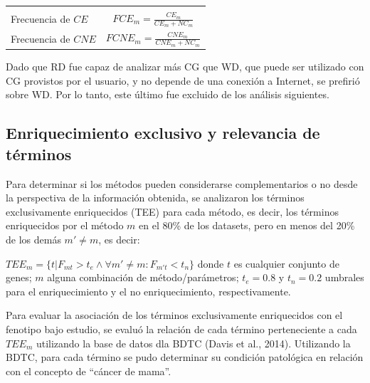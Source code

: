 \documentclass[12pt,twoside]{reedthesis}
\begin{document}
\begin{longtable}[]{@{}lc@{}}
\begin{minipage}[t]{0.50\columnwidth}
\end{minipage}\tabularnewline
\begin{minipage}[t]{0.44\columnwidth}\raggedright
Frecuencia de \(CE\)\strut
\end{minipage} & \begin{minipage}[t]{0.50\columnwidth}\centering
\(FCE_m=\frac{CE_m}{CE_m+NC_m}\)\strut
\end{minipage}\tabularnewline
\begin{minipage}[t]{0.44\columnwidth}\raggedright
Frecuencia de \(CNE\)\strut
\end{minipage} & \begin{minipage}[t]{0.50\columnwidth}\centering
\(FCNE_m=\frac{CNE_m}{CNE_m+NC_m}\)\strut
\end{minipage}\tabularnewline
\bottomrule
\end{longtable}
\par

Dado que RD fue capaz de analizar más CG que WD, que puede ser utilizado con CG provistos por el usuario, y no depende de una conexión a Internet, se prefirió sobre WD. Por lo tanto, este último fue excluido de los análisis siguientes.

\hypertarget{enriquecimiento-exclusivo-y-relevancia-de-terminos}{%
\subsection{Enriquecimiento exclusivo y relevancia de términos}\label{enriquecimiento-exclusivo-y-relevancia-de-terminos}}

\par

Para determinar si los métodos pueden considerarse complementarios o no desde la perspectiva de la información obtenida, se analizaron los términos exclusivamente enriquecidos (TEE) para cada método, es decir, los términos enriquecidos por el método \(m\) en el 80\% de los datasets, pero en menos del 20\% de los demás \(m' \neq m\), es decir:

\(TEE_m=\{t|F_{mt}>t_e \wedge \forall m' \neq m : F_{m't} < t_n \}\)
donde \(t\) es cualquier conjunto de genes; \(m\) alguna combinación de método/parámetros; \(t_e=0.8\) y \(t_n=0.2\) umbrales para el enriquecimiento y el no enriquecimiento, respectivamente.

\par

Para evaluar la asociación de los términos exclusivamente enriquecidos con el fenotipo bajo estudio, se evaluó la relación de cada término perteneciente a cada \(TEE_m\) utilizando la base de datos dla BDTC (Davis et al., 2014). Utilizando la BDTC, para cada término se pudo determinar su condición patológica en relación con el concepto de ``cáncer de mama''.
\end{document}
